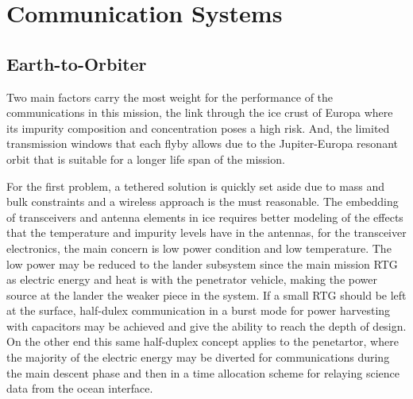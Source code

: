 \chapter{Communication Systems}



\section{Earth-to-Orbiter}







	



Two main factors carry the most weight for the performance of the communications in this mission, the link through the ice crust of Europa where its impurity composition and concentration poses a high risk. And, the limited transmission windows that each flyby allows due to the Jupiter-Europa resonant orbit that is suitable for a longer life span of the mission.

For the first problem, a tethered solution is quickly set aside due to mass and bulk constraints and a wireless approach is the must reasonable. The embedding of transceivers and antenna elements in ice requires better modeling of the effects that the temperature and impurity levels have in the antennas, for the transceiver electronics, the main concern is low power condition and low temperature. The low power may be reduced to the lander subsystem since the main mission RTG as electric energy and heat is with the penetrator vehicle, making the power source at the lander the weaker piece in the system. If a small RTG should be left at the surface, half-dulex communication in a burst mode for power harvesting with capacitors may be achieved and give the ability to reach the depth of design. On the other end this same half-duplex concept applies to the penetartor, where the majority of the electric energy may be diverted for communications during the main descent phase and then in a time allocation scheme for relaying science data from the ocean interface.

